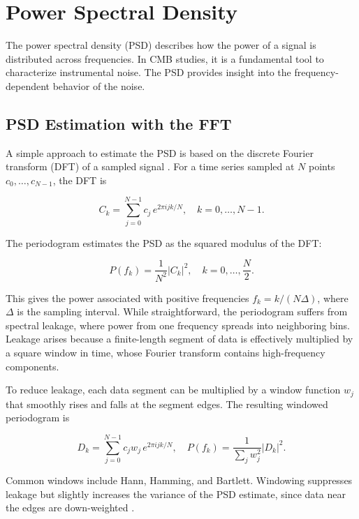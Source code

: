 \section{Power Spectral Density}

The power spectral density (PSD) describes how the power of a signal is distributed across frequencies. In CMB studies, it is a fundamental tool to characterize instrumental noise. The PSD provides insight into the frequency-dependent behavior of the noise.


\subsection{PSD Estimation with the FFT}
A simple approach to estimate the PSD is based on the discrete Fourier transform (DFT) of a sampled signal \cite{press2007numerical}. For a time series sampled at $N$ points $c_0, \dots, c_{N-1}$, the DFT is

\begin{equation}
C_k = \sum_{j=0}^{N-1} c_j \, e^{2\pi i jk / N}, \quad k = 0, \dots, N-1.
\end{equation}

The periodogram estimates the PSD as the squared modulus of the DFT:

\begin{equation}
P(f_k) = \frac{1}{N^2} |C_k|^2, \quad k = 0, \dots, \frac{N}{2}.
\end{equation}

This gives the power associated with positive frequencies $f_k = k / (N \Delta)$, where $\Delta$ is the sampling interval. While straightforward, the periodogram suffers from spectral leakage, where power from one frequency spreads into neighboring bins. Leakage arises because a finite-length segment of data is effectively multiplied by a square window in time, whose Fourier transform contains high-frequency components.

To reduce leakage, each data segment can be multiplied by a window function $w_j$ that smoothly rises and falls at the segment edges. The resulting windowed periodogram is

\begin{equation}
D_k = \sum_{j=0}^{N-1} c_j w_j \, e^{2\pi i jk / N}, \quad
P(f_k) = \frac{1}{\sum_j w_j^2} |D_k|^2.
\end{equation}

Common windows include Hann, Hamming, and Bartlett. Windowing suppresses leakage but slightly increases the variance of the PSD estimate, since data near the edges are down-weighted \cite{press2007numerical}.



